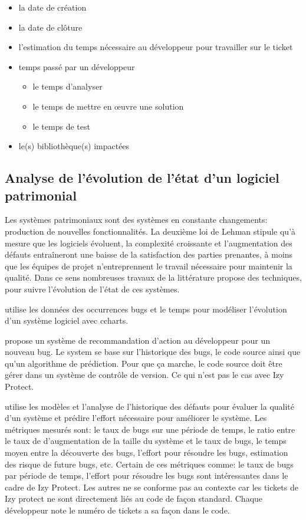 \documentclass[a4paper]{article}
\begin{document}
\begin{itemize}
\item  la date de création
\item la date de clôture
\item l'estimation du temps nécessaire au développeur pour travailler sur le ticket
\item temps passé par un développeur
  \begin{itemize}
  \item le temps d'analyser
  \item le temps de mettre en œuvre une solution
  \item le temps de test
  \end{itemize}
  \item le(s) bibliothèque(s) impactées
\end{itemize}

\subsection{Analyse de l'évolution de l'état d'un logiciel patrimonial}
\label{sec:etatLogiciel}

Les systèmes  patrimoniaux sont des systèmes en constante changements: production de nouvelles fonctionnalités.
 La deuxième loi de Lehman \cite{Lehm96a} stipule qu'à mesure que les logiciels évoluent, la complexité croissante et l'augmentation des défauts entraîneront une baisse de la satisfaction des parties prenantes, à moins que les équipes de projet n'entreprennent le travail nécessaire pour maintenir la qualité.
 Dans ce sens nombreuses travaux de la littérature propose des techniques, pour suivre l'évolution de l'état de  ces systèmes.
 
\citep{Zhan10b} utilise les données des occurrences bugs et le temps pour modéliser l'évolution d'un système logiciel avec  c\-charts.

\citep{lenar17} propose un système de recommandation  d'action au développeur pour un nouveau bug. Le system se  base sur l'historique des bugs, le code source ainsi que qu'un algorithme de prédiction.  Pour que ça marche, le code source doit être gérer dans un système de contrôle de version. Ce qui n'est pas le cas avec Izy Protect.
 
\citep{port17} utilise les modèles  et l'analyse de l'historique des défauts pour évaluer la qualité d'un système et prédire l'effort nécessaire pour améliorer le système. Les métriques mesurés sont: le taux de bugs sur une période de temps, le ratio entre le taux de d'augmentation de la taille du système et le taux de bugs, le temps moyen entre la découverte des bugs, l'effort pour résoudre les bugs, estimation des risque de future bugs, etc.
 Certain de ces métriques comme: le taux de bugs par période de temps, l'effort pour résoudre les bugs  sont intéressantes dans le cadre de Izy Protect. 
Les autres ne se conforme pas au contexte car les tickets de Izy protect ne sont directement liés au code de façon standard.
Chaque développeur note le numéro de tickets a sa façon dans le code. 
 
\end{document}
